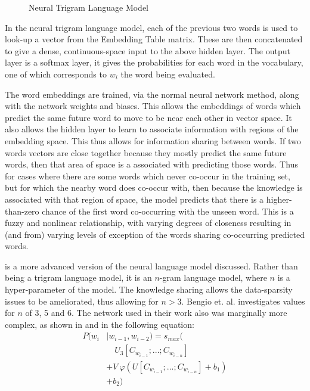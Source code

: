 \documentclass[parskip]{komatufte}
\begin{document}
\begin{figure}
	\centering
	 
	\caption{\label{fig:trigram-neural-language-model} Neural Trigram Language Model}
\end{figure}

In the neural trigram language model, each of the previous two words is used to look-up a vector from the Embedding Table matrix.
These are then concatenated to give a dense, continuous-space input to the above hidden layer.
The output layer is a softmax layer, it gives the probabilities for each word in the vocabulary, one of which corresponds to $w_i$ the word being evaluated.

The word embeddings are trained, via the normal neural network method, along with the network weights and biases.
This allows the embeddings of words which predict the same future word to move to be near each other in vector space.
It also allows the hidden layer to learn to associate information with regions of the embedding space.
This thus allows for information sharing between words.
If two words vectors are close together because they mostly predict the same future words, then that area of space is a associated with predicting those words.
Thus for cases where there are some words which never co-occur in the training set, but for which the nearby word does co-occur with, then because the knowledge is associated with that region of space, the model predicts that there is a higher-than-zero chance of the first word co-occurring with the unseen word.
This is a fuzzy and nonlinear relationship, with varying degrees of closeness resulting in (and from) varying levels of exception of the words sharing co-occurring predicted words.


 is a more advanced version of the neural language model discussed.
Rather than being a trigram language model, it is an $n$-gram language model, where $n$ is a hyper-parameter of the model.
The knowledge sharing allows the data-sparsity issues to be ameliorated, thus allowing for $n>3$.
%
%
Bengio et. al. investigates values for $n$ of 3, 5 and 6.
The network used in their work also was marginally more complex, as shown in  and in the following equation:
\begin{align}
P(w_i & \mid w_{i-1}, w_{i-2}) = s_{max}( \nonumber
\\  & \quad U_3 \left[ C_{w_{i-1}};...; C_{w_{i-n}}\right] \nonumber
\\  & + V \: \varphi\left( U\left[C_{w_{i-1}};...; C_{w_{i-n}} \right] + b_1\right) \nonumber
\\  & +b_2)
\end{align}
\end{document}
